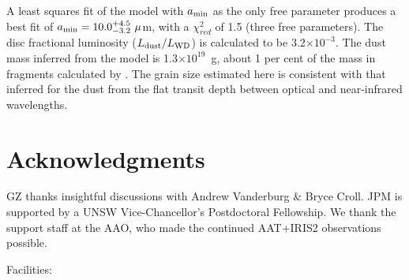 \documentclass[iop,useAMES,usenatbig]{emulateapj}
\begin{document}
A least squares fit of the model with $a_{\rm min}$ as the only free parameter produces a best fit of $a_{\rm min} = 10.0^{+4.5}_{-3.2}~\mu$m, with a $\chi^{2}_{red}$ of 1.5 (three free parameters). The disc fractional luminosity ($L_{\rm dust}/L_{\rm WD}$) is calculated to be 3.2$\times10^{-3}$. The dust mass inferred from the model is 1.3$\times10^{19}$~g, about 1 per cent of the mass in fragments calculated by \cite{2015Natur.526..546V}. The grain size estimated here is consistent with that inferred for the dust from the flat transit depth between optical and near-infrared wavelengths. 


\section{Acknowledgments}
GZ thanks insightful discussions with Andrew Vanderburg \& Bryce Croll. JPM is supported by a UNSW Vice-Chancellor's Postdoctoral Fellowship. We thank the support staff at the AAO, who made the continued AAT+IRIS2 observations possible. 

Facilities: 



\end{document}
